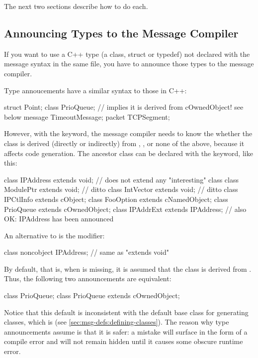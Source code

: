 The next two sections describe how to do each.


\subsection{Announcing Types to the Message Compiler}
\label{sec:msg-defs:announcing-types}

If you want to use a C++ type (a class, struct or typedef) not
declared with the message syntax in the same file, you have to
announce those types to the message compiler.

Type annoucements have a similar syntax to those in C++:

\begin{msg}
struct Point;
class PrioQueue;  // implies it is derived from cOwnedObject! see below
message TimeoutMessage;
packet TCPSegment;
\end{msg}

However, with the  keyword, the message compiler needs to
know the whether the class is derived (directly or indirectly) from
, ,  or none of
the above, because it affects code generation. The ancestor class can be
declared with the  keyword, like this:

\begin{msg}
class IPAddress extends void;  // does not extend any "interesting" class
class ModulePtr extends void;  // ditto
class IntVector extends void;  // ditto
class IPCtlInfo extends cObject;
class FooOption extends cNamedObject;
class PrioQueue extends cOwnedObject;
class IPAddrExt extends IPAddress;  // also OK: IPAddress has been announced
\end{msg}

An alternative to  is the  modifier:

\begin{msg}
class noncobject IPAddress; // same as "extends void"
\end{msg}

By default, that is, when  is missing, it is assumed
that the class is derived from . Thus, the following
two announcements are equivalent:

\begin{msg}
class PrioQueue;
class PrioQueue extends cOwnedObject;
\end{msg}

\begin{note}
Notice that this default is inconsistent with the default base class for
generating classes, which is  (see
\ref{sec:msg-defs:defining-classes}). The reason why type announcements
assume  is that it is safer: a mistake will surface in
the form of a compile error and will not remain hidden until it causes some
obscure runtime error.
\end{note}


